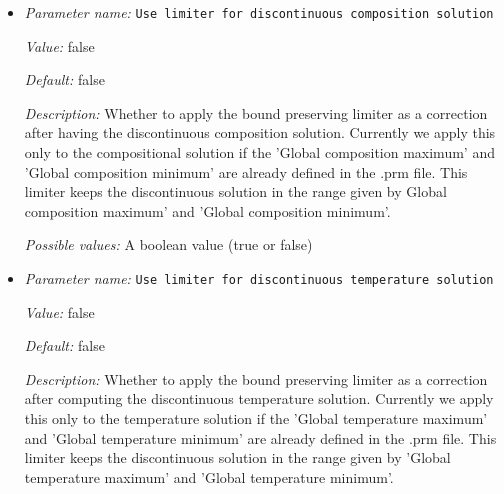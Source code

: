 \begin{itemize}
{\it Default:} false


{\it Description:} If set to false, the artificial viscosity of a cell is computed and is computed on every cell separately as discussed in \cite{KHB12}. If set to true, the maximum of the artificial viscosity in the cell as well as the neighbors of the cell is computed and used instead.


{\it Possible values:} A boolean value (true or false)
\item {\it Parameter name:} {\tt Use limiter for discontinuous composition solution}
\label{parameters:Discretization/Stabilization parameters/Use limiter for discontinuous composition solution}


{\it Value:} false


{\it Default:} false


{\it Description:} Whether to apply the bound preserving limiter as a correction after having the discontinuous composition solution. Currently we apply this only to the compositional solution if the 'Global composition maximum' and 'Global composition minimum' are already defined in the .prm file. This limiter keeps the discontinuous solution in the range given by Global composition maximum' and 'Global composition minimum'.


{\it Possible values:} A boolean value (true or false)
\item {\it Parameter name:} {\tt Use limiter for discontinuous temperature solution}
\label{parameters:Discretization/Stabilization parameters/Use limiter for discontinuous temperature solution}


{\it Value:} false


{\it Default:} false


{\it Description:} Whether to apply the bound preserving limiter as a correction after computing the discontinuous temperature solution. Currently we apply this only to the temperature solution if the 'Global temperature maximum' and 'Global temperature minimum' are already defined in the .prm file. This limiter keeps the discontinuous solution in the range given by 'Global temperature maximum' and 'Global temperature minimum'.



\end{itemize}
